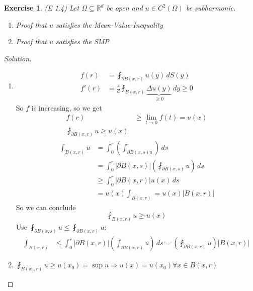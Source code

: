 \documentclass{report}
\theoremstyle{tommy}
\newtheorem{ex}[defn]{Exercise}
\begin{document}
\begin{ex} (E 1.4)
  Let \(\Omega \subseteq \mathbb{R}^d\) be open and \(u \in C^2(\Omega)\) be subharmonic.
  \begin{enumerate}
    \item Proof that \(u\) satisfies the Mean-Value-Inequality
    \item Proof that \(u\) satisfies the SMP
  \end{enumerate}
\end{ex}

\begin{proof}[Solution]
  \begin{enumerate}
    \item 
      \begin{align*}
        f(r) &= \fint_{\partial B(x, r)} u(y) \, dS(y) \\
        f'(r) &= \frac{r}{d} \fint_{B(x, r)} \underbrace{\Delta u(y)}_{\ge 0} \, dy \ge 0
      \end{align*}
      So \(f\) is increasing, so we get
      \begin{align*}
        f(r) &\ge \lim_{t \to 0} f(t) = u(x) \\
        \fint_{\partial B(x, r)} u \ge u(x)
      \end{align*}
      \begin{align*}
        \int_{B(x,r)} u 
        &= \int_0^r \left(\int_{\partial B(x,s) u}\right) \, ds \\
        &= \int_0^r |\partial B(x, s)| \left(\fint_{\partial B(x, s)} u\right) \, ds \\
        &\ge \int_0^r |\partial B(x,r)| u(x) \, ds \\
        &= u(x) \int_{B(x,r)} = u(x) |B(x,r)|
      \end{align*}
      So we can conclude
      \[\fint_{B(x,r)} u \ge u(x)\]
      Use \(\fint_{\partial B(x,s)} u \le \fint_{\partial B(x,r)} u\):
      \begin{align*}
        \int_{B(x,r)} 
        &\le \int_0^r |\partial B(x,r)| \left(\int_{\partial B(x,r)} u\right) \, ds = \left( \fint_{\partial B(x,r)} u \right) |B(x,r)|
      \end{align*}
    \item \(\fint_{B(x_0, r)} u \ge u(x_0) = \sup u \Rightarrow u(x) = u(x_0) \forall x \in B(x,r)\)
  \end{enumerate}
\end{proof}
\end{document}
